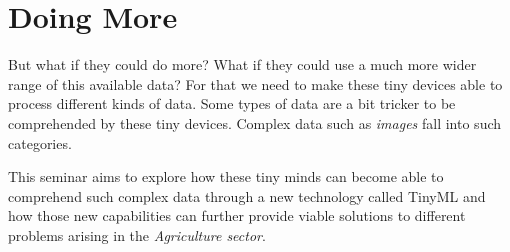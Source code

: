 \documentclass[../../main]{subfiles}
\begin{document}
\section{Doing More} \label{sec:}

But what if they could do more? What if they could use a much more wider
range of this available data? For that we need to make these tiny devices
able to process different kinds of data. Some types of data are a bit tricker
to be comprehended by these tiny devices. Complex data such as \emph{images} fall
into such categories.

This seminar aims to explore how these tiny minds can become able to comprehend
such complex data through a new technology called TinyML and how those new
capabilities can further provide viable solutions to different problems arising in
the \emph{Agriculture sector}.
\end{document}

